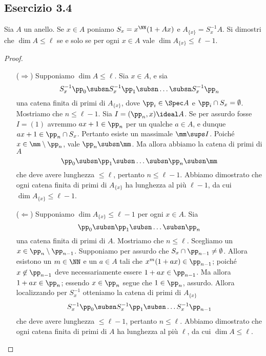 \documentclass[a4paper]{article}
\begin{document}
\subsection*{Esercizio 3.4}
Sia $A$ un anello. Se $x\in A$ poniamo $S_x=x^{\NN}(1+Ax)$ e $A_{\{x\}}=S_x^{-1}A$. Si dimostri che $\dim A\le\ell$ se e solo se per ogni $x\in A$ vale $\dim A_{\{x\}}\le\ell-1$.
\begin{proof}
\leavevmode
\begin{itemize}
\item[($\Rightarrow$)] Supponiamo $\dim A\le\ell$. Sia $x\in A$, e sia
$$
S_x^{-1}\pp_0\subsn S_x^{-1}\pp_1\subsn\ldots\subsn S_x^{-1}\pp_n
$$
una catena finita di primi di $A_{\{x\}}$, dove $\pp_i\in\Spec A$ e $\pp_i\cap S_x=\emptyset$. Mostriamo che $n\le\ell-1$. Sia $I=(\pp_n,x)\ideal A$. Se per assurdo fosse $I=(1)$ avremmo $ax+1\in\pp_n$ per un qualche $a\in A$, e dunque $ax+1\in\pp_n\cap S_x$. Pertanto esiste un massimale $\mm\sups I$. Poiché $x\in\mm\setminus\pp_n$, vale $\pp_n\subsn\mm$. Ma allora abbiamo la catena di primi di $A$
$$
\pp_0\subsn\pp_1\subsn\ldots\subsn\pp_n\subsn\mm
$$
che deve avere lunghezza $\le\ell$, pertanto $n\le\ell-1$. Abbiamo dimostrato che ogni catena finita di primi di $A_{\{x\}}$ ha lunghezza al più $\ell-1$, da cui $\dim A_{\{x\}}\le\ell-1$.
\item[($\Leftarrow$)] Supponiamo $\dim A_{\{x\}}\le\ell-1$ per ogni $x\in A$. Sia
$$
\pp_0\subsn\pp_1\subsn\ldots\subsn\pp_n
$$
una catena finita di primi di $A$. Mostriamo che $n\le\ell$. Scegliamo un $x\in\pp_n\setminus\pp_{n-1}$. Supponiamo per assurdo che $S_x\cap\pp_{n-1}\neq\emptyset$. Allora esistono un $m\in\NN$ e un $a\in A$ tali che $x^{m}(1+ax)\in\pp_{n-1}$; poiché $x\not\in\pp_{n-1}$ deve necessariamente essere $1+ax\in\pp_{n-1}$. Ma allora $1+ax\in\pp_{n}$; essendo $x\in\pp_n$ segue che $1\in\pp_n$, assurdo. Allora localizzando per $S_x^{-1}$ otteniamo la catena di primi di $A_{\{x\}}$
$$
S_x^{-1}\pp_0\subsn S_x^{-1}\pp_1\subsn\ldots S_x^{-1}\pp_{n-1}
$$
che deve avere lunghezza $\le\ell-1$, pertanto $n\le\ell$. Abbiamo dimostrato che ogni catena finita di primi di $A$ ha lunghezza al più $\ell$, da cui $\dim A\le\ell$.
\end{itemize}
\end{proof}

\newpage
\end{document}
